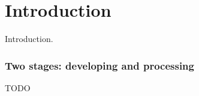 \section{Introduction}

\begin{frame}
	Introduction.
\end{frame}

\begin{frame}
    \frametitle{Two stages: developing and processing}
    TODO
\end{frame}
